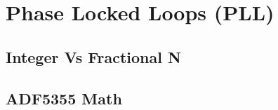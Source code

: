 \documentclass{article}
\numberwithin{figure}{subsection} %
\begin{document}
\graphicspath{{}{}} %
	
 
\newpage
\tableofcontents
\newpage



\section{Phase Locked Loops (PLL)}

\subsection{Integer Vs Fractional N}

\subsection{ADF5355 Math}

\newpage

\newpage


\nocite{*}
{} %

\end{document}
